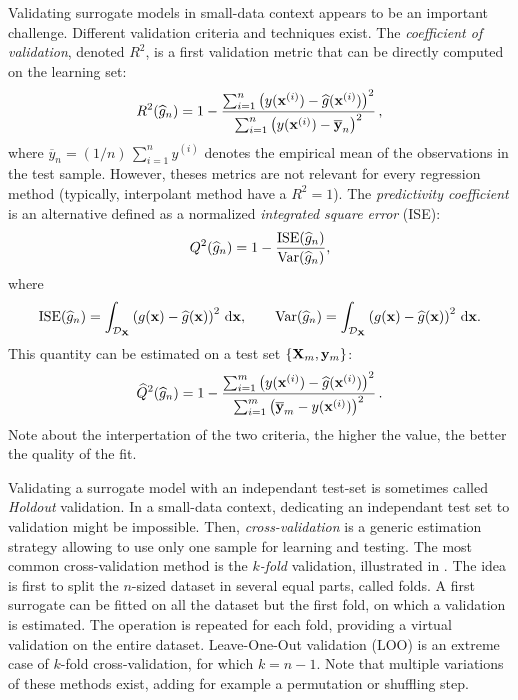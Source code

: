 Validating surrogate models in small-data context appears to be an important challenge. 
Different validation criteria and techniques exist. 
The \textit{coefficient of validation}, denoted $R^2$, is a first validation metric that can be directly computed on the learning set:
\begin{equation}
    R^2(\widehat{g}_n) = 1 - \frac{ \sum_{i=1}^n  \left(y({\bf x}^{(i)}) - \widehat{g}({\bf x}^{(i)})\right)^2}{\sum_{i=1}^n \left(y({\bf x}^{(i)})-\overline{{\bf y}}_n\right)^2}\,,
\end{equation}
where $\overline{y}_n=(1/n)\,\sum_{i=1}^n y^{(i)}$ denotes the empirical mean of the observations in the test sample. 
However, theses metrics are not relevant for every regression method (typically, interpolant method have a $R^2=1$). 
The \textit{predictivity coefficient} is an alternative defined as a normalized \textit{integrated square error} (ISE): 
\begin{equation}
    Q^2(\widehat{g}_n) = 1 - \frac{\mathrm{ISE}(\widehat{g}_n)}{\operatorname{Var}(\widehat{g}_n)}, 
\end{equation} 
where 
\begin{equation}
    \mathrm{ISE}(\widehat{g}_n) = \int_{\mathcal{D}_{{\bf X}}} \left(g({\bf x}) - \widehat{g}({\bf x})\right)^2 \, \mathrm{d}{\bf x}, \qquad
    \operatorname{Var}(\widehat{g}_n) = \int_{\mathcal{D}_{{\bf X}}} \left(g({\bf x}) - \widehat{g}({\bf x})\right)^2 \, \mathrm{d}{\bf x}.
\end{equation}
This quantity can be estimated on a test set $\left\{{\bf X}_m, {\bf y}_m\right\}$: 
\begin{equation}
    \widehat{Q}^2(\widehat{g}_n) = 1 - \frac{ \sum_{i=1}^m  \left(y({\bf x}^{(i)}) - \widehat{g}({\bf x}^{(i)})\right)^2}{\sum_{i=1}^m \left(\overline{{\bf y}}_m - y({\bf x}^{(i)})\right)^2}\,.
\end{equation}
Note about the interpertation of the two criteria, the higher the value, the better the quality of the fit. 

Validating a surrogate model with an independant test-set is sometimes called \textit{Holdout} validation.
In a small-data context, dedicating an independant test set to validation might be impossible.
Then, \textit{cross-validation} is a generic estimation strategy allowing to use only one sample for learning and testing. 
The most common cross-validation method is the \textit{$k$-fold} validation, illustrated in . 
The idea is first to split the $n$-sized dataset in several equal parts, called folds. 
A first surrogate can be fitted on all the dataset but the first fold, on which a validation is estimated. 
The operation is repeated for each fold, providing a virtual validation on the entire dataset. 
Leave-One-Out validation (LOO) is an extreme case of $k$-fold cross-validation, for which $k=n-1$. 
Note that multiple variations of these methods exist, adding for example a permutation or shuffling step. 

